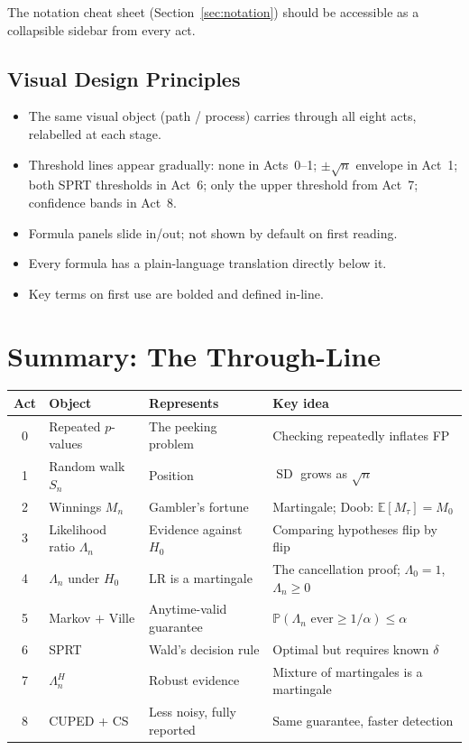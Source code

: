 \documentclass[12pt, a4paper]{article}
\newcommand{\E}{\mathbb{E}}            %
\newcommand{\Prob}{\mathbb{P}}         %
\newcommand{\SD}{\operatorname{SD}}
\newcommand{\LR}{\Lambda}              %
\begin{document}
The notation cheat sheet (Section~\ref{sec:notation}) should be accessible as a
collapsible sidebar from every act.

\subsection{Visual Design Principles}

\begin{itemize}[nosep]
  \item The same visual object (path / process) carries through all eight
        acts, relabelled at each stage.
  \item Threshold lines appear gradually: none in Acts~0--1; $\pm\sqrt{n}$
        envelope in Act~1; both SPRT thresholds in Act~6; only the upper
        threshold from Act~7; confidence bands in Act~8.
  \item Formula panels slide in/out; not shown by default on first reading.
  \item Every formula has a plain-language translation directly below it.
  \item Key terms on first use are bolded and defined in-line.
\end{itemize}


\newpage
\section{Summary: The Through-Line}

\begin{center}
\renewcommand{\arraystretch}{1.3}
\begin{tabular}{@{} c l l l @{}}
\toprule
\textbf{Act} & \textbf{Object} & \textbf{Represents} & \textbf{Key idea} \\
\midrule
0 & Repeated $p$-values
  & The peeking problem
  & Checking repeatedly inflates FP \\
1 & Random walk $S_n$
  & Position
  & $\SD$ grows as $\sqrt{n}$ \\
2 & Winnings $M_n$
  & Gambler's fortune
  & Martingale; Doob: $\E[M_\tau]=M_0$ \\
3 & Likelihood ratio $\LR_n$
  & Evidence against $H_0$
  & Comparing hypotheses flip by flip \\
4 & $\LR_n$ under $H_0$
  & LR is a martingale
  & The cancellation proof; $\LR_0{=}1$, $\LR_n{\geq}0$ \\
5 & Markov $+$ Ville
  & Anytime-valid guarantee
  & $\Prob(\LR_n \text{ ever}{\geq}1/\alpha)\leq\alpha$ \\
6 & SPRT
  & Wald's decision rule
  & Optimal but requires known $\delta$ \\
7 & $\LR_n^{H}$
  & Robust evidence
  & Mixture of martingales is a martingale \\
8 & CUPED + CS
  & Less noisy, fully reported
  & Same guarantee, faster detection \\
\bottomrule
\end{tabular}
\end{center}
\end{document}
